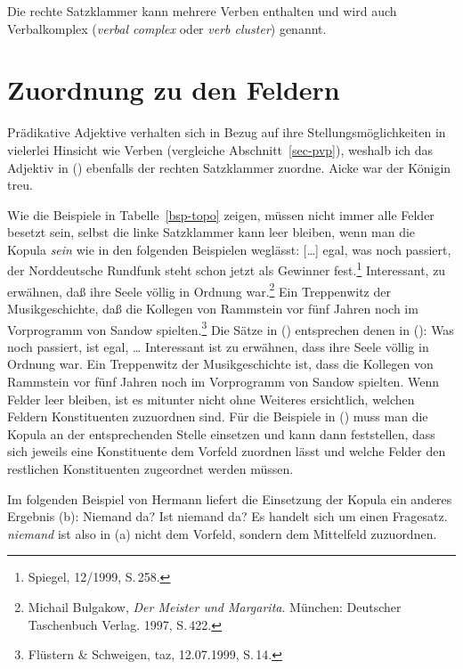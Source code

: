 Die rechte Satzklammer kann mehrere Verben enthalten und wird auch 
Verbalkomplex (\emph{verbal complex} oder \emph{verb cluster}) genannt.

\section{Zuordnung zu den Feldern}
\label{sec-Topologische-Felder-Zuordnung}

Prädikative Adjektive verhalten sich in Bezug auf ihre Stellungsmöglichkeiten in vielerlei Hinsicht
wie Verben (vergleiche Abschnitt~\ref{sec-pvp}), weshalb ich das Adjektiv in () ebenfalls der
rechten Satzklammer zuordne.
\ea
Aicke war der Königin treu.
\z
\largerpage

\noindent
Wie die Beispiele in Tabelle~\ref{bsp-topo} zeigen, müssen nicht immer
alle Felder besetzt sein, selbst die linke Satzklammer kann leer bleiben,
wenn man die Kopula \emph{sein} wie in den folgenden Beispielen weglässt:
\eal
\ex
{}[\ldots]
egal,      was  noch  passiert, der Norddeutsche Rundfunk             steht  schon   jetzt als Gewinner fest.\footnote{
        Spiegel, 12/1999, S.\,258.
}
\ex Interessant, zu erwähnen, daß ihre Seele völlig    in Ordnung war.\footnote{
        Michail Bulgakow, \emph{Der Meister und Margarita}. München: Deutscher Taschenbuch Verlag. 1997, S.\,422.
      }
\ex
Ein Treppenwitz der    Musikgeschichte, daß die Kollegen   von Rammstein vor    fünf Jahren noch im      Vorprogramm   von Sandow spielten.\footnote{
         Flüstern \& Schweigen, taz, 12.07.1999, S.\,14. %
}
\zl
Die Sätze in () entsprechen denen in ():
\eal
\ex 
Was noch passiert, ist egal, \ldots
\ex
Interessant ist zu erwähnen, dass ihre Seele völlig in Ordnung war.
\ex 
Ein Treppenwitz der Musikgeschichte ist, dass die Kollegen von Rammstein vor fünf Jahren noch im Vorprogramm von Sandow spielten.
\zl
Wenn Felder leer bleiben, ist es mitunter nicht ohne Weiteres
ersichtlich, welchen Feldern Konstituenten zuzuordnen sind.
Für die Beispiele in () muss man die Kopula an der entsprechenden Stelle einsetzen und kann
dann feststellen, dass sich jeweils eine Konstituente dem Vorfeld zuordnen lässt und welche Felder
den restlichen Konstituenten zugeordnet werden müssen.

Im folgenden Beispiel von Hermann \citet[]{Paul1919a} liefert die Einsetzung der Kopula
ein anderes Ergebnis (b):
\eal
\ex Niemand da?
\ex Ist niemand da?
\zl
Es handelt sich um einen Fragesatz. \emph{niemand} ist also in (a)
nicht dem Vorfeld, sondern dem Mittelfeld zuzuordnen.

